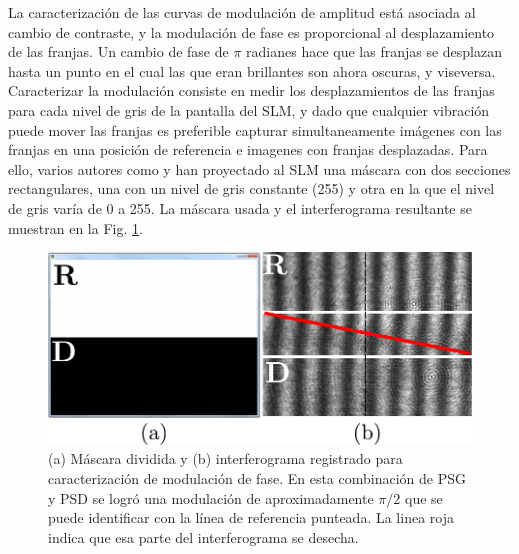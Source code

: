 La caracterización de las curvas de modulación de amplitud está
asociada al cambio de contraste, y la modulación de fase es
proporcional al desplazamiento de las franjas. Un cambio de fase de
$\pi$ radianes hace que las franjas se desplazan hasta un punto en el
cual las que eran brillantes son ahora oscuras, y
viseversa. Caracterizar la modulación consiste en medir los 
desplazamientos de las franjas para cada nivel de gris de la pantalla
del SLM, y dado que cualquier vibración puede mover las franjas es
preferible capturar simultaneamente imágenes con las franjas en una
posición de referencia e imagenes con franjas 
desplazadas. Para ello, varios autores como  y
 han proyectado al SLM una máscara con dos
secciones rectangulares, una con un nivel de gris constante (255) y
otra en la que el nivel de gris varía de 0 a 255. La máscara usada y
el interferograma resultante se muestran en la Fig. \ref{fig:split}.  
\begin{figure}[h!]
\centering
\includegraphics[scale=1]{split.pdf}
\caption[Máscara dividida e interferograma obtenido para
caracterización de modulación de fase]{(a) Máscara dividida y (b)
  interferograma registrado para
caracterización de modulación de fase. En esta combinación de PSG y
PSD se logró una modulación de aproximadamente $\pi/2$ que se puede
identificar con la línea de referencia punteada. La linea roja indica
que esa parte del interferograma se desecha.}
\label{fig:split}
\end{figure}

